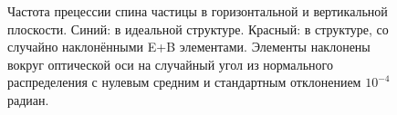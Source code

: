 \documentclass{article}
\begin{document}
	\begin{figure}[!htbp]\ContinuedFloat
		\caption{Частота прецессии спина частицы в горизонтальной и вертикальной плоскости. Синий: в идеальной структуре. Красный: в структуре, со случайно наклонёнными E+B элементами. Элементы наклонены вокруг оптической оси на случайный угол из нормального распределения с нулевым средним и стандартным отклонением $10^{-4}$ радиан.\label{fig:cross_plot}}
	\end{figure}
\end{document}

